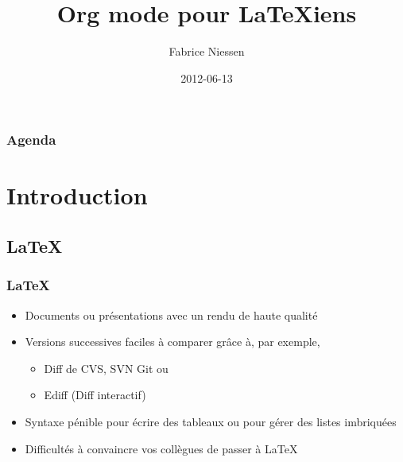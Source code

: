 \documentclass[presentation,t,hideothersubsections]{beamer}
\title{Org mode pour LaTeXiens}
\author{Fabrice Niessen}
\date{2012-06-13}
\begin{document}
\maketitle

\begin{frame}
\frametitle{Agenda}
\setcounter{tocdepth}{3}
\tableofcontents
\end{frame}

















\section{Introduction}
\label{sec-1}
\subsection{\LaTeX{}}
\label{sec-1-1}
\begin{frame}
\frametitle{\LaTeX{}}
\label{sec-1-1-1}


\begin{itemize}
\item Documents ou présentations avec un rendu de haute qualité
\item Versions successives faciles à comparer grâce à, par exemple,
\begin{itemize}
\item Diff de CVS, SVN Git ou
\item Ediff (Diff interactif)
\end{itemize}
\item Syntaxe pénible pour écrire des tableaux ou pour gérer des listes
  imbriquées
\item Difficultés à convaincre vos collègues de passer à \LaTeX{}
\end{itemize}
\end{frame}
\end{document}

